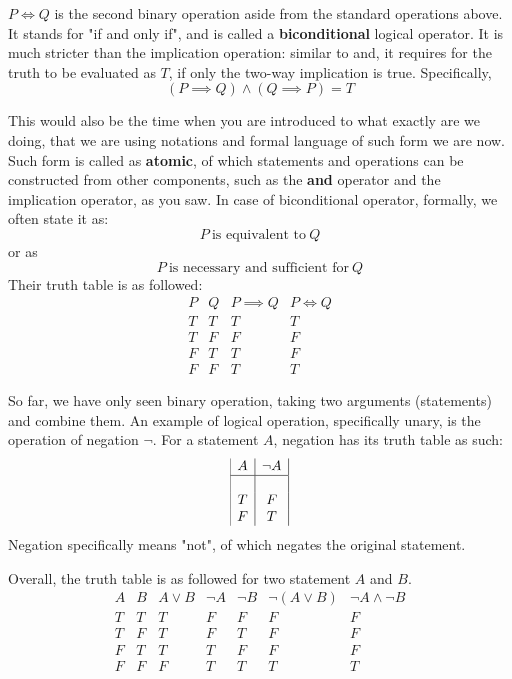 $P \iff Q$ is the second binary operation aside from the standard operations above. It stands for "if and only if", and is called a \textbf{biconditional} logical operator. It is much stricter than the implication operation: similar to and, it requires for the truth to be evaluated as $T$, if only the two-way implication is true. Specifically, 
\begin{equation*}
    (P \implies Q) \land (Q \implies P) = T 
\end{equation*}

This would also be the time when you are introduced to what exactly are we doing, that we are using notations and formal language of such form we are now. Such form is called as \textbf{atomic}, of which statements and operations can be constructed from other components, such as the \textbf{and} operator and the implication operator, as you saw. In case of biconditional operator, formally, we often state it as: 
\begin{equation*}
    P \: \text{is equivalent to}\: Q
\end{equation*}
or as 
\begin{equation*}
    P\: \text{is necessary and sufficient for}\: Q
\end{equation*}
Their truth table is as followed:
$$\begin{array}{|c|c|c|c|c|}
P & Q & P \implies Q & P \iff Q  \\
T & T & T & T  \\
T & F & F & F    \\
F & T & T & F \\
F & F & T & T 
\end{array}$$


So far, we have only seen binary operation, taking two arguments (statements) and combine them. An example of logical operation, specifically unary, is the operation of negation $\neg$. For a statement $A$, negation has its truth table as such:
$$
\begin{array}{{|c |c|}} 
A & \neg A  \\
\hline & \\
T & F \\
F & T
\end{array}
$$
Negation specifically means "not", of which negates the original statement. 

Overall, the truth table is as followed for two statement $A$ and $B$. 
$$
\begin{array}{|c|c|c|c|c|c|c|}
A & B & A \lor B  & \neg A & \neg B & \neg(A \lor B) & \neg A \land \neg B \\
T & T & T & F & F & F & F \\
T & F & T & F & T & F & F \\
F & T & T & T & F & F & F \\
F & F & F & T & T & T & T
\end{array}
$$

